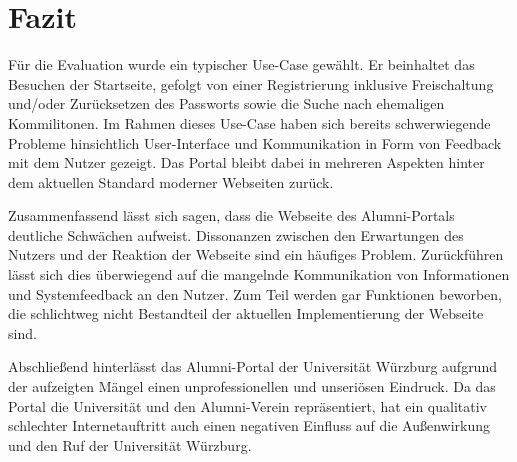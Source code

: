 \section{Fazit}\label{sec:fazit}
Für die Evaluation wurde ein typischer Use-Case gewählt. Er beinhaltet das Besuchen der Startseite, gefolgt von einer Registrierung inklusive Freischaltung und/oder Zurücksetzen des Passworts sowie die Suche nach ehemaligen Kommilitonen. 
Im Rahmen dieses Use-Case haben sich bereits schwerwiegende Probleme hinsichtlich User-Interface und Kommunikation in Form von Feedback mit dem Nutzer gezeigt. Das Portal bleibt dabei in mehreren Aspekten hinter dem aktuellen Standard moderner Webseiten zurück. 

Zusammenfassend lässt sich sagen, dass die Webseite des Alumni-Portals deutliche Schwächen aufweist. Dissonanzen zwischen den Erwartungen des Nutzers und der Reaktion der Webseite sind ein häufiges Problem.
Zurückführen lässt sich dies überwiegend auf die mangelnde Kommunikation von Informationen und Systemfeedback an den Nutzer.
Zum Teil werden gar Funktionen beworben, die schlichtweg nicht Bestandteil der aktuellen Implementierung der Webseite sind.

Abschließend hinterlässt das Alumni-Portal der Universität Würzburg aufgrund der aufzeigten Mängel einen unprofessionellen und unseriösen Eindruck. 
Da das Portal die Universität und den Alumni-Verein repräsentiert, hat ein qualitativ schlechter Internetauftritt auch einen negativen Einfluss auf die Außenwirkung und den Ruf der Universität Würzburg. 